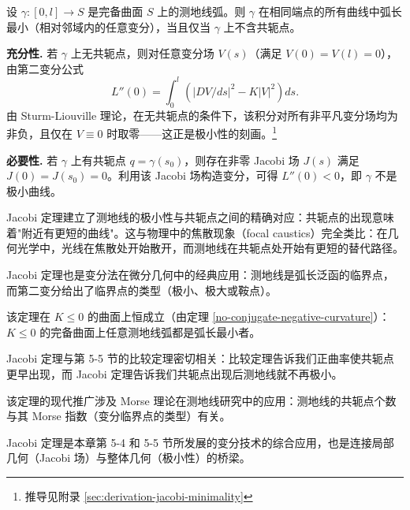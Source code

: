 \begin{Remark}
\begin{Theorem}\label{jacobi-minimality}
设 $\gamma: [0,l] \to S$ 是完备曲面 $S$ 上的测地线弧。则 $\gamma$ 在相同端点的所有曲线中弧长最小（相对邻域内的任意变分），当且仅当 $\gamma$ 上不含共轭点。
\end{Theorem}

\textbf{充分性.} 若 $\gamma$ 上无共轭点，则对任意变分场 $V(s)$（满足 $V(0)=V(l)=0$），由第二变分公式
\[
L''(0) = \int_0^l\left(|DV/ds|^2 - K|V|^2\right)ds.
\]
由 Sturm-Liouville 理论，在无共轭点的条件下，该积分对所有非平凡变分场均为非负，且仅在 $V\equiv 0$ 时取零——这正是极小性的刻画。\footnote{推导见附录 \cref{sec:derivation-jacobi-minimality}}

\textbf{必要性.} 若 $\gamma$ 上有共轭点 $q = \gamma(s_0)$，则存在非零 Jacobi 场 $J(s)$ 满足 $J(0)=J(s_0)=0$。利用该 Jacobi 场构造变分，可得 $L''(0) < 0$，即 $\gamma$ 不是极小曲线。

\begin{Remark}
Jacobi 定理建立了测地线的极小性与共轭点之间的精确对应：共轭点的出现意味着"附近有更短的曲线"。这与物理中的焦散现象（focal caustics）完全类比：在几何光学中，光线在焦散处开始散开，而测地线在共轭点处开始有更短的替代路径。
\end{Remark}

\begin{Remark}
Jacobi 定理也是变分法在微分几何中的经典应用：测地线是弧长泛函的临界点，而第二变分给出了临界点的类型（极小、极大或鞍点）。
\end{Remark}

\begin{Remark}
该定理在 $K \leq 0$ 的曲面上恒成立（由定理 \ref{no-conjugate-negative-curvature}）：$K \leq 0$ 的完备曲面上任意测地线弧都是弧长最小者。
\end{Remark}

\begin{Remark}
Jacobi 定理与第 5-5 节的比较定理密切相关：比较定理告诉我们正曲率使共轭点更早出现，而 Jacobi 定理告诉我们共轭点出现后测地线就不再极小。
\end{Remark}

\begin{Remark}
该定理的现代推广涉及 Morse 理论在测地线研究中的应用：测地线的共轭点个数与其 Morse 指数（变分临界点的类型）有关。
\end{Remark}

\begin{Remark}
Jacobi 定理是本章第 5-4 和 5-5 节所发展的变分技术的综合应用，也是连接局部几何（Jacobi 场）与整体几何（极小性）的桥梁。
\end{Remark}


\end{Remark}
